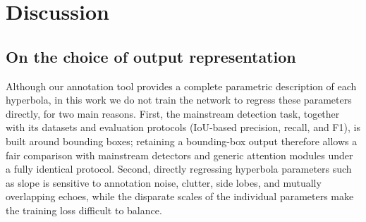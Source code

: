 \documentclass[lettersize,journal]{IEEEtran}
\begin{document}
\section{Discussion}
\subsection{On the choice of output representation}


Although our annotation tool provides a complete parametric description of each hyperbola,
in this work we do not train the network to regress these parameters directly, for two main reasons.
First, the mainstream detection task, together with its datasets and evaluation protocols (IoU-based
precision, recall, and F1), is built around bounding boxes; retaining a
bounding-box output therefore allows a fair comparison with mainstream detectors
and generic attention modules under a fully identical protocol. 
Second, directly regressing hyperbola parameters such as slope is sensitive to annotation
noise, clutter, side lobes, and mutually overlapping echoes, while the disparate
scales of the individual parameters make the training loss difficult to balance.


\end{document}
